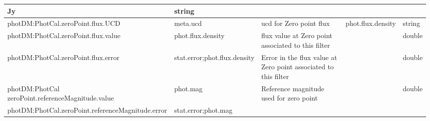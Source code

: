 \documentclass[11pt,a4paper]{ivoa}
\begin{document}
\begin{appendices}
\begin{table}[H]
\begin{adjustbox}{angle=90}
\begin{tabular}{p{3in}p{0.87in}p{2in}p{1in}p{0.25in}}
\multicolumn{1}{p{1in}}{{\fontsize{8pt}{8pt}\selectfont Jy}} &
\multicolumn{1}{p{0.25in}}{{\fontsize{8pt}{8pt}\selectfont string}} \\
\hline
\multicolumn{1}{p{3in}}{{\fontsize{8pt}{8pt}\selectfont photDM:PhotCal.zeroPoint.flux.UCD}} &
\multicolumn{1}{p{0.87in}}{{\fontsize{8pt}{8pt}\selectfont meta.ucd }} &
\multicolumn{1}{p{2in}}{{\fontsize{8pt}{8pt}\selectfont ucd for Zero point flux}} &
\multicolumn{1}{p{1in}}{{\fontsize{8pt}{8pt}\selectfont phot.flux.density}} &
\multicolumn{1}{p{0.25in}}{{\fontsize{8pt}{8pt}\selectfont string}} \\
\hline
\multicolumn{1}{p{3in}}{{\fontsize{8pt}{8pt}\selectfont photDM:PhotCal.zeroPoint.flux.value}} &
\multicolumn{1}{p{0.87in}}{{\fontsize{8pt}{8pt}\selectfont phot.flux.density }} &
\multicolumn{1}{p{2in}}{{\fontsize{8pt}{8pt}\selectfont flux value at Zero point associated to this filter}} &
\multicolumn{1}{p{1in}}{} &
\multicolumn{1}{p{0.25in}}{{\fontsize{8pt}{8pt}\selectfont double}} \\
\hline
\multicolumn{1}{p{3in}}{{\fontsize{8pt}{8pt}\selectfont photDM:PhotCal.zeroPoint.flux.error}} &
\multicolumn{1}{p{0.87in}}{{\fontsize{8pt}{8pt}\selectfont stat.error;phot.flux.density}} &
\multicolumn{1}{p{2in}}{{\fontsize{8pt}{8pt}\selectfont Error in the flux value at Zero point associated to this filter}} &
\multicolumn{1}{p{1in}}{} &
\multicolumn{1}{p{0.25in}}{{\fontsize{8pt}{8pt}\selectfont double}} \\
\hline
\multicolumn{1}{p{3in}}{{\fontsize{8pt}{8pt}\selectfont photDM:PhotCal zeroPoint.referenceMagnitude.value}} &
\multicolumn{1}{p{0.87in}}{{\fontsize{8pt}{8pt}\selectfont phot.mag}} &
\multicolumn{1}{p{2in}}{{\fontsize{8pt}{8pt}\selectfont Reference magnitude used for zero point}} &
\multicolumn{1}{p{1in}}{{\fontsize{8pt}{8pt}\selectfont 0.0}} &
\multicolumn{1}{p{0.25in}}{{\fontsize{8pt}{8pt}\selectfont double} \par } \\
\hline
\multicolumn{1}{p{3in}}{{\fontsize{8pt}{8pt}\selectfont photDM:PhotCal.zeroPoint.referenceMagnitude.error}} &
\multicolumn{1}{p{0.87in}}{{\fontsize{8pt}{8pt}\selectfont stat.error;phot.mag}} &


\end{tabular}
\end{adjustbox}
\end{table}
\end{appendices}
\end{document}
